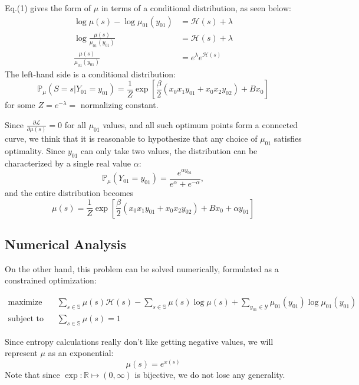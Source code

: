\documentclass[12pt]{article}
\begin{document}
Eq.(1) gives the form of $\mu$ in terms of a conditional distribution, as seen below:
\begin{align*}
    \log \mu(s) - \log \mu_{01}(y_{01})  & = \mathcal{H}(s) + \lambda     \\
    \log \frac{\mu(s)}{\mu_{01}(y_{01})} & = \mathcal{H}(s) + \lambda     \\
    \frac{\mu(s)}{\mu_{01}(y_{01})}      & = e^\lambda e^{\mathcal{H}(s)}
\end{align*}
The left-hand side is a conditional distribution:
\begin{equation}
    \mathbb{P}_\mu (S = s | Y_{01} = y_{01}) = \frac1Z \exp\left[\frac{\beta}{2}(x_0x_1y_{01} + x_0x_2y_{02}) + Bx_0\right]
\end{equation}
for some $Z = e^{-\lambda} = $ normalizing constant.

Since $\frac{\partial \mathcal{L}}{\partial \mu(s)} = 0$ for all $\mu_{01}$ values, and all such optimum points form a connected curve,
we think that it is reasonable to hypothesize that any choice of $\mu_{01}$ satisfies optimality.
Since $y_{01}$ can only take two values, the distribution can be characterized by a single real value $\alpha$:
\begin{equation*}
    \mathbb{P}_\mu(Y_{01} = y_{01}) = \frac{e^{\alpha y_{01}}}{e^\alpha + e^{-\alpha}},
\end{equation*}
and the entire distribution becomes
\begin{equation*}
    \mu(s) = \frac1Z \exp\left[\frac{\beta}{2}(x_0x_1y_{01} + x_0x_2y_{02}) + Bx_0 + \alpha y_{01}\right]
\end{equation*}

\subsection{Numerical Analysis}

On the other hand, this problem can be solved numerically, formulated as a constrained optimization:

\begin{align*}
    \text{maximize}\quad   & \sum_{s\in \mathbb{S}} \mu(s) \mathcal{H}(s) - \sum_{s\in \mathbb{S}} \mu(s) \log \mu(s) + \sum_{y_{01}\in \mathcal{Y}} \mu_{01}(y_{01}) \log\mu_{01}(y_{01}) \\
    \text{subject to}\quad & \sum_{s\in\mathbb{S}} \mu(s) = 1
\end{align*}

Since entropy calculations really don't like getting negative values, we will represent $\mu$ as an exponential:
\begin{equation*}
    \mu(s) = e^{x(s)}
\end{equation*}
Note that since $\exp: \mathbb{R} \mapsto (0, \infty)$ is bijective, we do not lose any generality.
\end{document}
